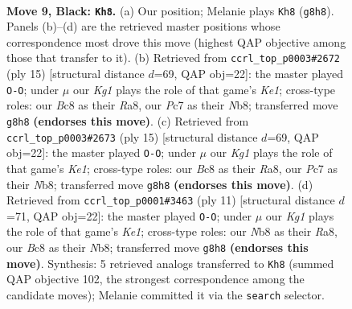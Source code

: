 \documentclass[11pt]{article}
\begin{document}
\clearpage

\begin{figure}[p]\centering
\begin{subfigure}{0.46\textwidth}\centering
\resizebox{\linewidth}{!}{%
\newchessgame
\chessboard[
  setfen={rnb1r1k1/pppnqppp/4p3/3pP3/3P4/2N1Q3/PPP2PPP/2KR1BNR b - - 5 9},
  showmover=false,
  pgfstyle=straightmove, color=movearrow, markmove={g8-h8}
]}
\caption{}
\end{subfigure}\hfill
\begin{subfigure}{0.46\textwidth}\centering
\resizebox{\linewidth}{!}{%
\newchessgame
\chessboard[
  setfen={rnbqk2r/pp3pbp/3p1np1/2pP4/8/5NP1/PP2PPBP/RNBQ1RK1 b kq - 3 8},
  showmover=false,
  pgfstyle=straightmove, color=movearrow, markmove={e8-g8}
]}
\caption{}
\end{subfigure}
\\[4pt]
\begin{subfigure}{0.46\textwidth}\centering
\resizebox{\linewidth}{!}{%
\newchessgame
\chessboard[
  setfen={rnbqk2r/pp3pbp/3p1np1/2pP4/8/5NP1/PP2PPBP/RNBQ1RK1 b kq - 3 8},
  showmover=false,
  pgfstyle=straightmove, color=movearrow, markmove={e8-g8}
]}
\caption{}
\end{subfigure}\hfill
\begin{subfigure}{0.46\textwidth}\centering
\resizebox{\linewidth}{!}{%
\newchessgame
\chessboard[
  setfen={rnbqk2r/ppp2ppp/3ppn2/8/2PPP3/2N5/PP1Q1PPP/R3KBNR b KQkq - 0 6},
  showmover=false,
  pgfstyle=straightmove, color=movearrow, markmove={e8-g8}
]}
\caption{}
\end{subfigure}
\caption{\textbf{Move 9, Black: \texttt{Kh8}.} (a) Our position; Melanie plays \texttt{Kh8} (\texttt{g8h8}). Panels (b)--(d) are the retrieved master positions whose correspondence most drove this move (highest QAP objective among those that transfer to it). (b) Retrieved from \texttt{ccrl\_top\_p0003\#2672} (ply 15) [structural distance $d$=69, QAP obj=22]: the master played \texttt{O-O}; under $\mu$ our \emph{Kg1} plays the role of that game's \emph{Ke1}; cross-type roles: our \emph{B}c8 as their \emph{R}a8, our \emph{P}c7 as their \emph{N}b8; transferred move \texttt{g8h8} \textbf{(endorses this move)}. (c) Retrieved from \texttt{ccrl\_top\_p0003\#2673} (ply 15) [structural distance $d$=69, QAP obj=22]: the master played \texttt{O-O}; under $\mu$ our \emph{Kg1} plays the role of that game's \emph{Ke1}; cross-type roles: our \emph{B}c8 as their \emph{R}a8, our \emph{P}c7 as their \emph{N}b8; transferred move \texttt{g8h8} \textbf{(endorses this move)}. (d) Retrieved from \texttt{ccrl\_top\_p0001\#3463} (ply 11) [structural distance $d$=71, QAP obj=22]: the master played \texttt{O-O}; under $\mu$ our \emph{Kg1} plays the role of that game's \emph{Ke1}; cross-type roles: our \emph{N}b8 as their \emph{R}a8, our \emph{B}c8 as their \emph{N}b8; transferred move \texttt{g8h8} \textbf{(endorses this move)}. Synthesis: 5 retrieved analogs transferred to \texttt{Kh8} (summed QAP objective 102, the strongest correspondence among the candidate moves); Melanie committed it via the \texttt{search} selector.}
\label{fig:thought-m17}
\end{figure}
\end{document}
